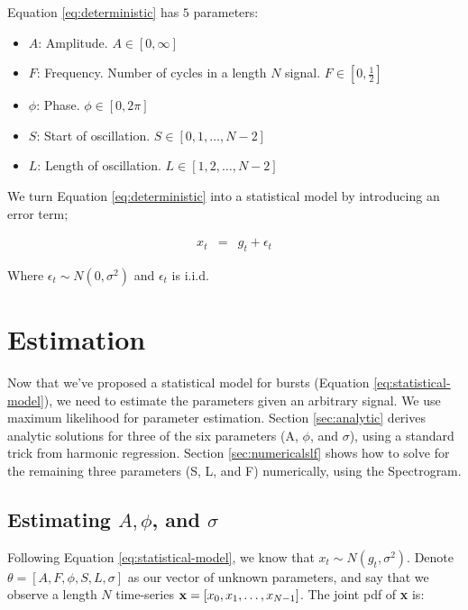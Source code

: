\documentclass[11pt]{article}
\theoremstyle{plain}
\theoremstyle{definition}
\begin{document}
\noindent Equation \ref{eq:deterministic} has $5$ parameters:

\begin{itemize}
\setlength\itemsep{.1em}
	\item $A$: Amplitude. $A \in [0, \infty]$
	\item $F$: Frequency. Number of cycles in a length $N$ signal. $F \in [0, \frac{1}{2}]$
	\item $\phi$: Phase. $\phi \in [0, 2 \pi]$
	\item $S$: Start of oscillation. $S \in [0, 1, \ldots, N - 2]$
	\item $L$: Length of oscillation. $L \in [1, 2, \ldots, N - 2]$
\end{itemize}

\noindent We turn Equation \ref{eq:deterministic} into a statistical model by introducing an error term;

\begin{eqnarray}
\label{eq:statistical-model}
x_t &=& g_t + \epsilon_t 
\end{eqnarray}

\noindent Where $\epsilon_t \sim N(0, \sigma^2)$ and $\epsilon_t$ is i.i.d.

\section{Estimation}
\label{sec:estimation}
Now that we've proposed a statistical model for bursts (Equation \ref{eq:statistical-model}), we need to estimate the parameters given an arbitrary signal. We use maximum likelihood for parameter estimation. Section \ref{sec:analytic} derives analytic solutions for three of the six parameters (A, $\phi$, and $\sigma$), using a standard trick from harmonic regression. Section \ref{sec:numericalslf} shows how to solve for the remaining three parameters (S, L, and F) numerically, using the Spectrogram. 

\subsection{Estimating $A, \phi$, and $\sigma$}
\label{sec:aphisigma}

Following Equation \ref{eq:statistical-model}, we know that $x_t \sim N(g_t, \sigma^2)$. Denote $\theta = [A, F, \phi, S, L, \sigma]$ as our vector of unknown parameters, and say that we observe a length $N$ time-series ${\bf x} = [x_0, x_1, \ldots, x_{N - 1}]$. The joint pdf of {\bf x} is:
\end{document}
